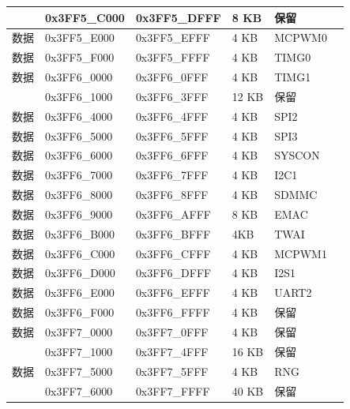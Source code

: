 \begin{longtable}[c]{ |p{1.5cm}|p{3cm}|p{3cm}|p{1.5cm}|p{3cm}|p{3cm}| }
    \rowcolor{gray!25}
    & 0x3FF5\_C000 & 0x3FF5\_DFFF & 8 KB & 保留 & \\
    
    \hline
    数据 & 0x3FF5\_E000 & 0x3FF5\_EFFF & 4 KB & MCPWM0 & \\
    \hline
    数据 & 0x3FF5\_F000 & 0x3FF5\_FFFF & 4 KB & TIMG0 & \\
    \hline
    数据 & 0x3FF6\_0000 & 0x3FF6\_0FFF & 4 KB & TIMG1 & \\
    \hline
    \rowcolor{gray!25}
    & 0x3FF6\_1000 & 0x3FF6\_3FFF & 12 KB & 保留 & \\
    \hline
    数据 & 0x3FF6\_4000 & 0x3FF6\_4FFF & 4 KB & SPI2 & \\
    \hline
    数据 & 0x3FF6\_5000 & 0x3FF6\_5FFF & 4 KB & SPI3 & \\
    \hline
    数据 & 0x3FF6\_6000 & 0x3FF6\_6FFF & 4 KB & SYSCON & \\
    \hline
    数据 & 0x3FF6\_7000 & 0x3FF6\_7FFF & 4 KB & I2C1 & \\
    \hline
    数据 & 0x3FF6\_8000 & 0x3FF6\_8FFF & 4 KB & SDMMC & \\
    \hline
    数据 & 0x3FF6\_9000 & 0x3FF6\_AFFF & 8 KB & EMAC & \\
    \hline
    
    数据 & 0x3FF6\_B000 & 0x3FF6\_BFFF & 4KB & TWAI & \\
    \hline
    数据 & 0x3FF6\_C000 & 0x3FF6\_CFFF & 4 KB & MCPWM1 & \\
    \hline
    数据 & 0x3FF6\_D000 & 0x3FF6\_DFFF & 4 KB & I2S1 & \\
    \hline
    数据 & 0x3FF6\_E000 & 0x3FF6\_EFFF & 4 KB & UART2 & \\
    \hline
    数据 & 0x3FF6\_F000 & 0x3FF6\_FFFF & 4 KB & 保留 & \\
    \hline
    数据 & 0x3FF7\_0000 & 0x3FF7\_0FFF & 4 KB & 保留 & \\
    \hline
    
    \rowcolor{gray!25}
    & 0x3FF7\_1000 & 0x3FF7\_4FFF & 16 KB & 保留 & \\
    
    \hline
    数据 & 0x3FF7\_5000 & 0x3FF7\_5FFF & 4 KB & RNG & \\
    \hline
    \rowcolor{gray!25}
    & 0x3FF7\_6000 & 0x3FF7\_FFFF & 40 KB & 保留 & \\
    
\end{longtable}
